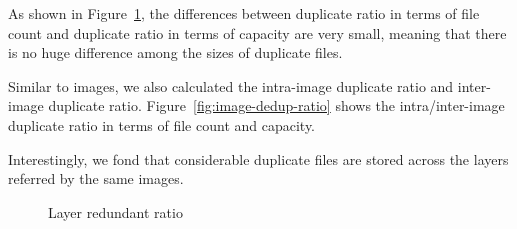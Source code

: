 As shown in Figure~\ref{fig:layer-dedup-ratio}, the differences between  duplicate ratio in terms of file count and  duplicate ratio in terms of capacity are very small, meaning that there is no huge difference among the sizes of duplicate files.

Similar to images, we also calculated the intra-image duplicate ratio and inter-image duplicate ratio. Figure~\ref{fig:image-dedup-ratio} shows the intra/inter-image duplicate ratio in terms of file count and capacity. 


Interestingly, we fond that considerable duplicate files are stored across the layers referred by the same images.


\begin{figure}
	\centering
	\caption{Layer redundant ratio}
	\label{fig:layer-dedup-ratio}
\end{figure}

